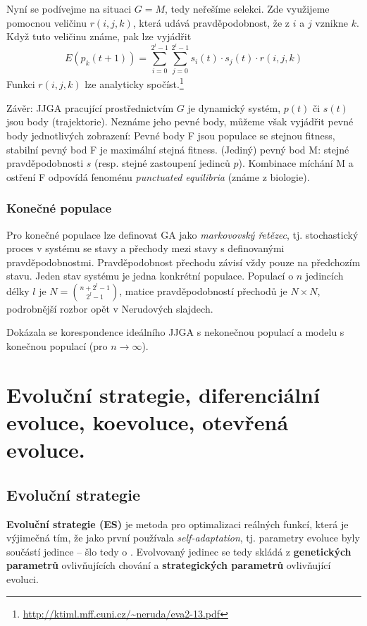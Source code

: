 Nyní se podívejme na situaci $G = M$, tedy neřešíme selekci. Zde využijeme pomocnou veličinu $r(i,j,k)$, která udává pravděpodobnost, že z $i$ a $j$ vznikne $k$. Když tuto veličinu známe, pak lze vyjádřit 
$$E(p_k(t+1)) = \sum\limits_{i=0}^{2^l-1} \sum\limits_{j=0}^{2^l-1} s_i(t) \cdot s_j(t) \cdot r(i,j,k)$$
Funkci $r(i,j,k)$ lze analyticky spočíst.\footnote{\url{http://ktiml.mff.cuni.cz/~neruda/eva2-13.pdf}}

Závěr: JJGA pracující prostřednictvím $G$ je dynamický systém, $p(t)$ či $s(t)$ jsou body (trajektorie). Neznáme jeho pevné body, můžeme však vyjádřit pevné body jednotlivých zobrazení: Pevné body F jsou populace se stejnou fitness, stabilní pevný bod F je maximální stejná fitness. (Jediný) pevný bod M: stejné pravděpodobnosti $s$ (resp. stejné zastoupení jedinců $p$). Kombinace míchání M a ostření F odpovídá fenoménu \textit{punctuated equilibria} (známe z biologie).

\subsubsection{Konečné populace}
Pro konečné populace lze definovat GA jako \textit{markovovský řetězec}, tj. stochastický proces v systému se stavy a přechody mezi stavy s definovanými pravděpodobnostmi. Pravděpodobnost přechodu závisí vždy pouze na předchozím stavu. Jeden stav systému je jedna konkrétní populace. Populací o $n$ jedincích délky $l$ je $N = \binom{n+2^l-1}{2^l-1}$, matice pravděpodobností přechodů je $N\times N$, podrobnější rozbor opět v Nerudových slajdech.

Dokázala se korespondence ideálního JJGA s nekonečnou populací a modelu s konečnou populací (pro $n \rightarrow \infty$).






\section{Evoluční strategie, diferenciální evoluce, koevoluce, otevřená evoluce.} 
\subsection{Evoluční strategie}
\textbf{Evoluční strategie (ES)} je metoda pro optimalizaci reálných funkcí, která je výjimečná tím, že jako první používala \textit{self-adaptation}, tj. parametry evoluce byly součástí jedince -- šlo tedy o . Evolvovaný jedinec se tedy skládá z \textbf{genetických parametrů} ovlivňujících chování a \textbf{strategických parametrů} ovlivňující evoluci.

